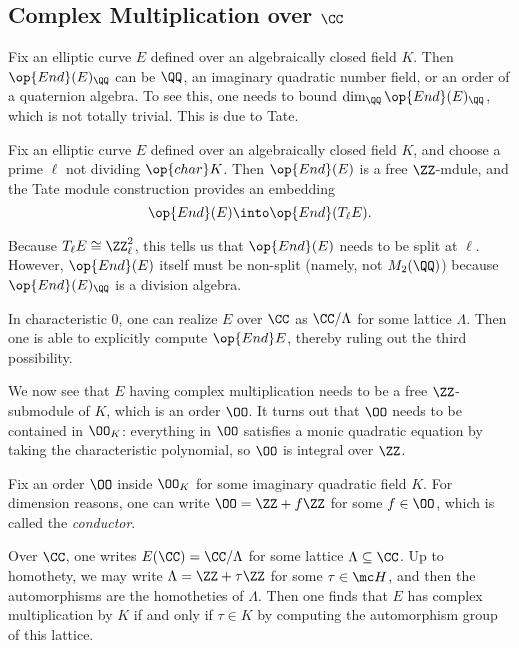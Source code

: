 \documentclass[../notes.tex]{subfiles}
\begin{document}
\subsection{Complex Multiplication over \texorpdfstring{$\CC$}{C}}
Fix an elliptic curve $E$ defined over an algebraically closed field $K$. Then $\op{End}(E)_\QQ$ can be $\QQ$, an imaginary quadratic number field, or an order of a quaternion algebra. To see this, one needs to bound $\dim_\QQ\op{End}(E)_\QQ$, which is not totally trivial. This is due to Tate.
\begin{theorem}[Tate]
	Fix an elliptic curve $E$ defined over an algebraically closed field $K$, and choose a prime $\ell$ not dividing $\op{char}K$. Then $\op{End}(E)$ is a free $\ZZ$-mdule, and the Tate module construction provides an embedding
	\[\op{End}(E)\into\op{End}(T_\ell E).\]
\end{theorem}
\begin{remark}	
	Because $T_\ell E\cong\ZZ_\ell^2$, this tells us that $\op{End}(E)$ needs to be split at $\ell$. However, $\op{End}(E)$ itself must be non-split (namely, not $M_2(\QQ)$) because $\op{End}(E)_\QQ$ is a division algebra.
\end{remark}
\begin{remark}
	In characteristic $0$, one can realize $E$ over $\CC$ as $\CC/\Lambda$ for some lattice $\Lambda$. Then one is able to explicitly compute $\op{End}E$, thereby ruling out the third possibility.
\end{remark}
We now see that $E$ having complex multiplication needs to be a free $\ZZ$-submodule of $K$, which is an order $\OO$. It turns out that $\OO$ needs to be contained in $\OO_K$: everything in $\OO$ satisfies a monic quadratic equation by taking the characteristic polynomial, so $\OO$ is integral over $\ZZ$.
\begin{definition}[conductor]
	Fix an order $\OO$ inside $\OO_K$ for some imaginary quadratic field $K$. For dimension reasons, one can write $\OO=\ZZ+f\ZZ$ for some $f\in\OO$, which is called the \textit{conductor}.
\end{definition}
\begin{remark}
	Over $\CC$, one writes $E(\CC)=\CC/\Lambda$ for some lattice $\Lambda\subseteq\CC$. Up to homothety, we may write $\Lambda=\ZZ+\tau\ZZ$ for some $\tau\in\mc H$, and then the automorphisms are the homotheties of $\Lambda$. Then one finds that $E$ has complex multiplication by $K$ if and only if $\tau\in K$ by computing the automorphism group of this lattice.
\end{remark}
\end{document}

